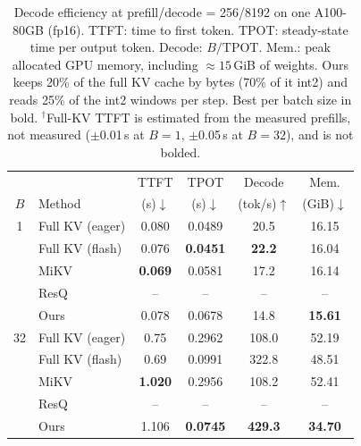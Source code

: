 \begin{table}[t]
\centering
\small
\setlength{\tabcolsep}{2.5pt}
\begin{tabular}{@{}cl cccc@{}}
\toprule
 &        & TTFT & TPOT & Decode & Mem. \\
$B$ & Method & (s)$\downarrow$ & (s)$\downarrow$ & (tok/s)$\uparrow$ & (GiB)$\downarrow$ \\
\midrule
 1 & Full KV (eager) & 0.080\rlap{$^\dagger$} &          0.0489  &          20.5   &          16.15  \\ %
   & Full KV (flash) & 0.076\rlap{$^\dagger$} & \textbf{0.0451}  & \textbf{22.2}   &          16.04  \\ %
   & MiKV            & \textbf{0.069} &          0.0581  &          17.2   &          16.14  \\
   & ResQ            &          --    &            --    &            --   &            --   \\ %
   & Ours            &          0.078 &          0.0678  &          14.8   & \textbf{15.61}  \\
\midrule
32 & Full KV (eager) & 0.75\rlap{$^\dagger$}  &          0.2962  &         108.0   &          52.19  \\ %
   & Full KV (flash) & 0.69\rlap{$^\dagger$}  &          0.0991  &         322.8   &          48.51  \\ %
   & MiKV            & \textbf{1.020} &          0.2956  &         108.2   &          52.41  \\
   & ResQ            &          --    &            --    &            --   &            --   \\ %
   & Ours            &          1.106 & \textbf{0.0745}  & \textbf{429.3}  & \textbf{34.70}  \\
\bottomrule
\end{tabular}
\caption{Decode efficiency at prefill/decode = 256/8192 on one A100-80GB
(fp16). TTFT: time to first token. TPOT: steady-state time per output token.
Decode: $B/\mathrm{TPOT}$. Mem.: peak allocated GPU memory, including
${\approx}15$\,GiB of weights. Ours keeps 20\% of the full KV cache by bytes
(70\% of it int2) and reads 25\% of the int2 windows per step. Best per batch
size in bold. $^\dagger$Full-KV TTFT is estimated from the measured prefills,
not measured ($\pm$0.01\,s at $B{=}1$, $\pm$0.05\,s at $B{=}32$), and is not
bolded.}
\label{tab:decode-256-8192}
\end{table}

